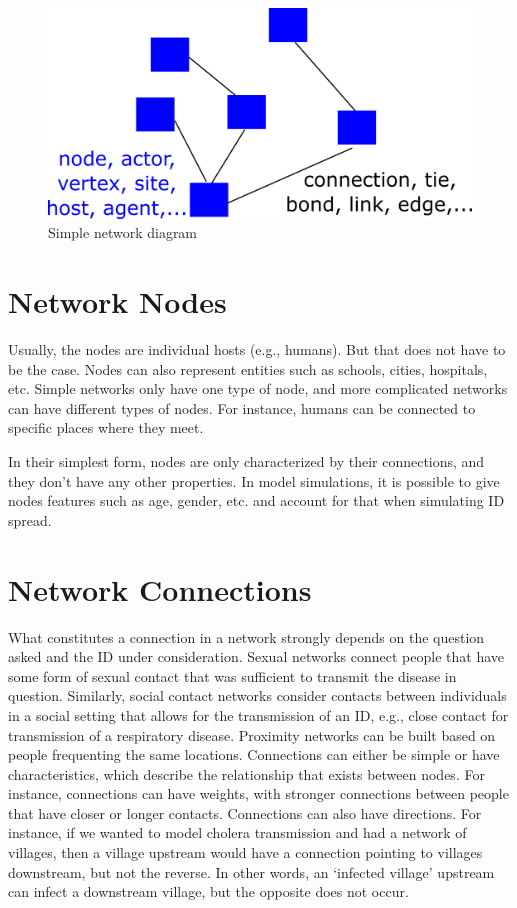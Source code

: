 \documentclass[]{book}
\theoremstyle{definition}
\theoremstyle{definition}
\theoremstyle{definition}
\theoremstyle{remark}
\begin{document}
\begin{figure}
\centering
\includegraphics{./images/network-diagram.png}
\caption{Simple network diagram}
\end{figure}

\section{Network Nodes}\label{network-nodes}

Usually, the nodes are individual hosts (e.g., humans). But that does
not have to be the case. Nodes can also represent entities such as
schools, cities, hospitals, etc. Simple networks only have one type of
node, and more complicated networks can have different types of nodes.
For instance, humans can be connected to specific places where they
meet.

In their simplest form, nodes are only characterized by their
connections, and they don't have any other properties. In model
simulations, it is possible to give nodes features such as age, gender,
etc. and account for that when simulating ID spread.

\section{Network Connections}\label{network-connections}

What constitutes a connection in a network strongly depends on the
question asked and the ID under consideration. Sexual networks connect
people that have some form of sexual contact that was sufficient to
transmit the disease in question. Similarly, social contact networks
consider contacts between individuals in a social setting that allows
for the transmission of an ID, e.g., close contact for transmission of a
respiratory disease. Proximity networks can be built based on people
frequenting the same locations. Connections can either be simple or have
characteristics, which describe the relationship that exists between
nodes. For instance, connections can have weights, with stronger
connections between people that have closer or longer contacts.
Connections can also have directions. For instance, if we wanted to
model cholera transmission and had a network of villages, then a village
upstream would have a connection pointing to villages downstream, but
not the reverse. In other words, an `infected village' upstream can
infect a downstream village, but the opposite does not occur.
\end{document}

